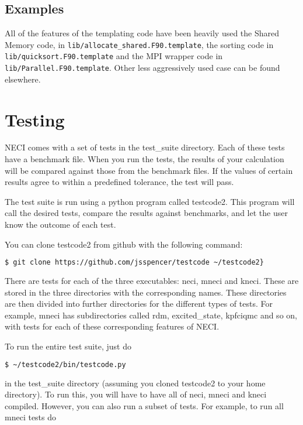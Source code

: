 \documentclass[a4paper,notitlepage,dvipsnames]{scrreprt}
\let\code\lstinline
\begin{document}
{{{\subsection{Examples}
	All of the features of the templating code have been heavily used the
	Shared Memory code, in \code{lib/allocate_shared.F90.template},
	the sorting code in \code{lib/quicksort.F90.template} and the
	MPI wrapper code in \code{lib/Parallel.F90.template}. Other less
	aggressively used case can be found elsewhere.

\section{Testing}
NECI comes with a set of tests in the test\_suite directory. Each of these
tests have a benchmark file. When you run the tests, the results of your
calculation will be compared against those from the benchmark files. If the
values of certain results agree to within a predefined tolerance, the test
will pass.

The test suite is run using a python program called testcode2. This program
will call the desired tests, compare the results against benchmarks, and let
the user know the outcome of each test.

You can clone testcode2 from github with the following command:

\begin{lstlisting}[language=bash]
    $ git clone https://github.com/jsspencer/testcode ~/testcode2}
\end{lstlisting}

There are tests for each of the three executables: neci, mneci and kneci.
These are stored in the three directories with the corresponding names.
These directories are then divided into further directories for the
different types of tests. For example, mneci has subdirectories called
rdm, excited\_state, kpfciqmc and so on, with tests for each of these
corresponding features of NECI.

To run the entire test suite, just do

\begin{lstlisting}[language=bash]
    $ ~/testcode2/bin/testcode.py
\end{lstlisting}

in the test\_suite directory (assuming you cloned testcode2 to your home
directory). To run this, you will have to have all of neci, mneci and
kneci compiled.  However, you can also run a subset of tests. For example,
to run all mneci tests do

}}}
\end{document}
